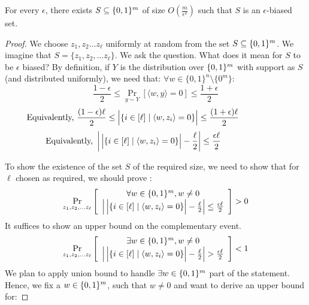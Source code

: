\begin{theorem}
For every $\epsilon$, there exists $S \subseteq \{0,1\}^m$ of size $O(\frac{m}{\epsilon^2})$ such that $S$ is an $\epsilon$-biased set.
\end{theorem}
\begin{proof}
We choose $z_1, z_2 \ldots z_\ell$ uniformly at random from the set $S \subseteq \{0,1\}^m$. We imagine that $S = \{z_1, z_2, \ldots z_\ell\}$. We ask the question. What does it mean for $S$ to be $\epsilon$ biased?  By definition, if $Y$ is the distribution over $\{0,1\}^m$ with support as $S$ (and distributed uniformly), we need that:
$\forall w \in \{0,1\}^n \setminus \{0^m\}$:
$$\frac{1-\epsilon}{2} \le \Pr_{y \sim Y}\left[ \langle w,y \rangle = 0 \right] \le \frac{1+\epsilon}{2}$$
$$\textrm{\hspace{-2cm} Equivalently, } \frac{(1-\epsilon)\ell}{2} \le \card{\vphantom{2^{2^{2}}}\{i \in [\ell] \mid \langle w,z_i \rangle = 0\}} \le \frac{(1+\epsilon)\ell}{2}$$
$$\textrm{\hspace{-2cm} Equivalently, } \left| \vphantom{2^{2^{2^2}}} \card{\vphantom{2^{2^{2}}}\{i \in [\ell] \mid \langle w,z_i \rangle = 0\}} - \frac{\ell}{2} \right| \le \frac{\epsilon\ell}{2}$$

To show the existence of the set $S$ of the required size, we need to show that for $\ell$ chosen as required, we should prove :
$$\Pr_{z_1,z_2, \ldots z_\ell} \left[ 
\begin{array}{cc}
 \forall w \in \zo^m, w \ne 0 \\
\left| \vphantom{2^{2^{2^2}}} \card{\vphantom{2^{2^{2}}}\{i \in [\ell] \mid \langle w,z_i \rangle = 0\}} - \frac{\ell}{2} \right| \le \frac{\epsilon\ell}{2}
\end{array}
\right]
 > 0
$$
It suffices to show an upper bound on the complementary event.
$$\Pr_{z_1,z_2, \ldots z_\ell} \left[ 
\begin{array}{cc}
 \exists w \in \zo^m, w \ne 0 \\
\left| \vphantom{2^{2^{2^2}}} \card{\vphantom{2^{2^{2}}}\{i \in [\ell] \mid \langle w,z_i \rangle = 0\}} - \frac{\ell}{2} \right| > \frac{\epsilon\ell}{2}
\end{array}
\right]
< 1
$$
We plan to apply union bound to handle $\exists w \in \{0,1\}^m$ part of the statement. Hence, we fix a $w \in \{0,1\}^m$, such that $w \ne 0$ and want to derive an upper bound for:


\end{proof}
